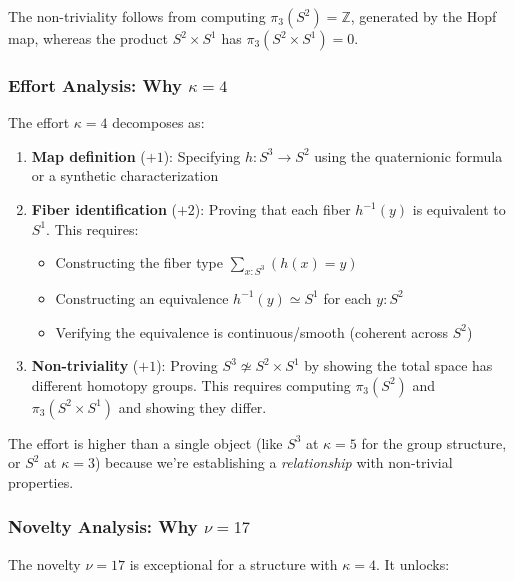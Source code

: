 \documentclass[11pt]{article}
\theoremstyle{definition}
\begin{document}
The non-triviality follows from computing $\pi_3(S^2) = \mathbb{Z}$, generated by the Hopf map, whereas the product $S^2 \times S^1$ has $\pi_3(S^2 \times S^1) = 0$.

\subsubsection{Effort Analysis: Why $\kappa = 4$}

The effort $\kappa=4$ decomposes as:

\begin{enumerate}
\item \textbf{Map definition} ($+1$): Specifying $h : S^3 \to S^2$ using the quaternionic formula or a synthetic characterization

\item \textbf{Fiber identification} ($+2$): Proving that each fiber $h^{-1}(y)$ is equivalent to $S^1$. This requires:
\begin{itemize}
\item Constructing the fiber type $\sum_{x:S^3} (h(x) = y)$
\item Constructing an equivalence $h^{-1}(y) \simeq S^1$ for each $y : S^2$
\item Verifying the equivalence is continuous/smooth (coherent across $S^2$)
\end{itemize}

\item \textbf{Non-triviality} ($+1$): Proving $S^3 \not\simeq S^2 \times S^1$ by showing the total space has different homotopy groups. This requires computing $\pi_3(S^2)$ and $\pi_3(S^2 \times S^1)$ and showing they differ.
\end{enumerate}

The effort is higher than a single object (like $S^3$ at $\kappa=5$ for the group structure, or $S^2$ at $\kappa=3$) because we're establishing a \emph{relationship} with non-trivial properties.

\subsubsection{Novelty Analysis: Why $\nu = 17$}

The novelty $\nu=17$ is exceptional for a structure with $\kappa=4$. It unlocks:
\end{document}
